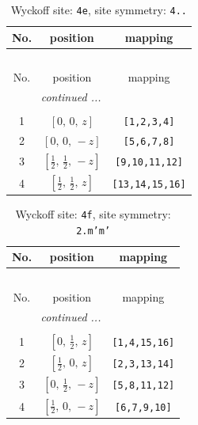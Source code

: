 \documentclass[fleqn,8pt]{jsarticle}
\begin{document}
\begin{longtable}{ccc}
\caption{Wyckoff site: {\tt 4e}, site symmetry: {\tt 4..}}
 \\
 \hline \hline
No. & position & mapping \\ \hline \endfirsthead

\multicolumn{2}{l}{\tablename\ \thetable{}} \\
 \hline \hline
No. & position & mapping \\ \hline \endhead

 \hline \hline
\multicolumn{2}{r}{\footnotesize\it continued ...} \\ \endfoot

 \hline \hline
\multicolumn{2}{r}{} \\ \endlastfoot

1 & $\left[ 0,\, 0,\, z \right]$ & {\tt [1,2,3,4]} \\ \hline
2 & $\left[ 0,\, 0,\, - z \right]$ & {\tt [5,6,7,8]} \\ \hline
3 & $\left[ \frac{1}{2},\, \frac{1}{2},\, - z \right]$ & {\tt [9,10,11,12]} \\ \hline
4 & $\left[ \frac{1}{2},\, \frac{1}{2},\, z \right]$ & {\tt [13,14,15,16]} \\
\end{longtable}
\renewcommand{\arraystretch}{1.2}
\begin{longtable}{ccc}
\caption{Wyckoff site: {\tt 4f}, site symmetry: {\tt 2.m'm'}}
 \\
 \hline \hline
No. & position & mapping \\ \hline \endfirsthead

\multicolumn{2}{l}{\tablename\ \thetable{}} \\
 \hline \hline
No. & position & mapping \\ \hline \endhead

 \hline \hline
\multicolumn{2}{r}{\footnotesize\it continued ...} \\ \endfoot

 \hline \hline
\multicolumn{2}{r}{} \\ \endlastfoot

1 & $\left[ 0,\, \frac{1}{2},\, z \right]$ & {\tt [1,4,15,16]} \\ \hline
2 & $\left[ \frac{1}{2},\, 0,\, z \right]$ & {\tt [2,3,13,14]} \\ \hline
3 & $\left[ 0,\, \frac{1}{2},\, - z \right]$ & {\tt [5,8,11,12]} \\ \hline
4 & $\left[ \frac{1}{2},\, 0,\, - z \right]$ & {\tt [6,7,9,10]} \\
\end{longtable}
\end{document}
